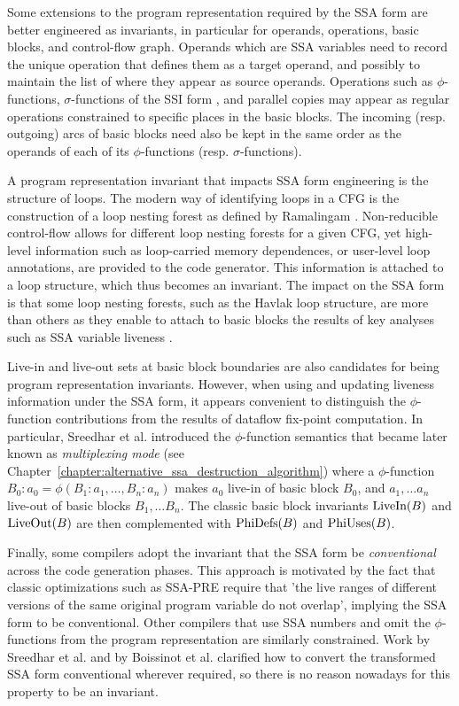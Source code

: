Some extensions to the program representation required by the SSA form are
better engineered as invariants, in particular for operands, operations, basic
blocks, and control-flow graph.  Operands which are SSA variables need to record
the unique operation that defines them as a target operand, and possibly to
maintain the list of where they appear as source operands. Operations such as
$\phi$-functions, $\sigma$-functions of the SSI form \cite{Boissinot:2011:APLAS}, and
parallel copies may appear as regular operations constrained to specific places
in the basic blocks. The incoming (resp. outgoing) arcs of basic blocks need also be kept in the
same order as the operands of each of its $\phi$-functions (resp. $\sigma$-functions).

A program representation invariant that impacts SSA form engineering is the
structure of loops. The modern way of identifying loops in a CFG is the
construction of a loop nesting forest as defined by Ramalingam
\cite{Ramalingam:2002:TOPLAS}. Non-reducible control-flow allows for different
loop nesting forests for a given CFG, yet high-level information such as
loop-carried memory dependences, or user-level loop annotations, are provided to
the code generator. This information is attached to a loop structure, which thus
becomes an invariant. The impact on the SSA form is that some loop nesting
forests, such as the Havlak \cite{Havlak:1997:TOPLAS} loop structure, are more than
others as they enable to attach to basic blocks the results of key analyses
such as SSA variable liveness \cite{Boissinot:2011:APLAS}.

Live-in and live-out sets at basic block boundaries are also
candidates for being program representation invariants. However, when using and
updating liveness information under the SSA form, it appears convenient to
distinguish the $\phi$-function contributions from the results of dataflow
fix-point computation.  In particular, Sreedhar et al.  \cite{Sreedhar:1999:SAS}
introduced the $\phi$-function semantics that became later known as
\emph{multiplexing mode} (see Chapter~\ref{chapter:alternative_ssa_destruction_algorithm})
where a $\phi$-function $B_0:a_0=\phi(B_1:a_1,\dots,B_n:a_n)$ makes $a_0$ live-in of
basic block $B_0$, and $a_1,\dots a_n$ live-out of basic blocks $B_1,\dots B_n$.
The classic basic block invariants $\hbox{LiveIn}(B)$ and $\hbox{LiveOut}(B)$
are then complemented with $\hbox{PhiDefs}(B)$ and $\hbox{PhiUses}(B)$.

Finally, some compilers adopt the invariant that the SSA form be
\emph{conventional} across the code generation phases. This approach is
motivated by the fact that classic optimizations such as SSA-PRE
\cite{Kennedy:1999:TOPLAS} require that 'the live ranges of different versions
of the same original program variable do not overlap', implying the SSA form to be
conventional. Other compilers that use SSA numbers and omit the $\phi$-functions
from the program representation \cite{Lapkowski:1996:CASCON} are similarly
constrained. Work by Sreedhar et al.  \cite{Sreedhar:1999:SAS} and by Boissinot
et al.  \cite{Boissinot:2009:CGO} clarified how to convert the transformed SSA
form conventional wherever required, so there is no reason nowadays for this
property to be an invariant.

